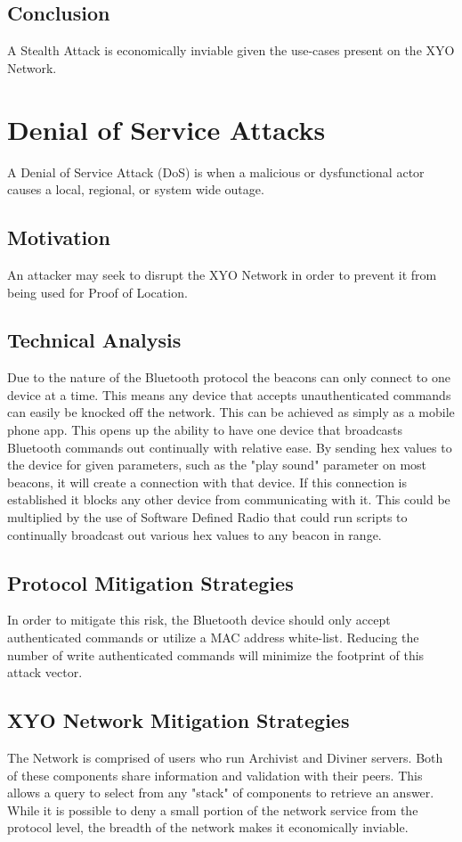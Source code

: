\documentclass{article}
\begin{document}
\subsection{Conclusion}
A Stealth Attack is economically inviable given the use-cases present on the XYO Network.

\section{Denial of Service Attacks}
A Denial of Service Attack (DoS) is when a malicious or dysfunctional actor causes a local, regional, or system wide outage. 

\subsection{Motivation}

An attacker may seek to disrupt the XYO Network in order to prevent it from being used for Proof of Location.

\subsection{Technical Analysis}
Due to the nature of the Bluetooth protocol the beacons can only connect to one device at a time. This means any device that accepts unauthenticated commands can easily be knocked off the network. This can be achieved as simply as a mobile phone app. This opens up the ability to have one device that broadcasts Bluetooth commands out continually with relative ease. By sending hex values to the device for given parameters, such as the "play sound" parameter on most beacons, it will create a connection with that device. If this connection is established it blocks any other device from communicating with it. This could be multiplied by the use of Software Defined Radio that could run scripts to continually broadcast out various hex values to any beacon in range. 

\subsection{Protocol Mitigation Strategies}
In order to mitigate this risk, the Bluetooth device should only accept authenticated commands or utilize a MAC address white-list. Reducing the number of write authenticated commands will minimize the footprint of this attack vector. 

\subsection{XYO Network Mitigation Strategies}
The Network is comprised of users who run Archivist and Diviner servers. Both of these components share information and validation with their peers. This allows a query to select from any "stack" of components to retrieve an answer. While it is possible to deny a small portion of the network service from the protocol level, the breadth of the network makes it economically inviable. 
\end{document}
